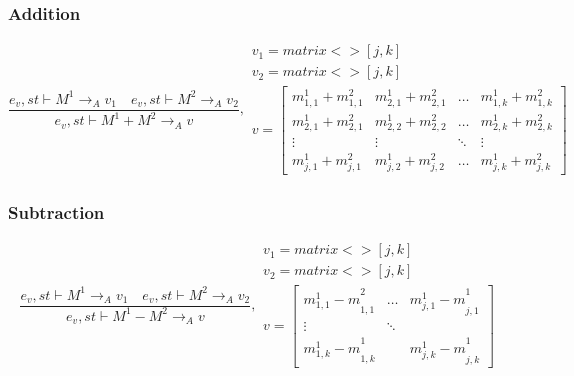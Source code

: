 \subsubsection{Addition}
\begin{equation}
	\frac { { e }_{ v },st\vdash { M }^{ 1 }{ \rightarrow  }_{ A }{ v }_{ 1 }\quad { e }_{ v },st\vdash { M }^{ 2 }{ \rightarrow  }_{ A }{ v }_{ 2 } }{ { e }_{ v },st\vdash { M }^{ 1 }+{ M }^{ 2 }{ \rightarrow  }_{ A }{ v } } ,\begin{matrix} { v }_{ 1 }=matrix<>[j,k] \\ { v }_{ 2 }=matrix<>[j,k] \\ v=\begin{bmatrix} { { m }_{ 1,1 }^{ 1 } } +{ { m }_{ 1,1 }^{ 2 } } & { { m }_{ 2,1 }^{ 1 } } + { { m }_{ 2,1 }^{ 2 } } & \dots  & { m }_{ 1,k }^{ 1 }+{ { m }_{ 1,k }^{ 2} } \\
{ { m }_{ 2,1 }^{ 1 } } + { { m }_{ 2,1 }^{ 2 } } &  { { m }_{ 2,2 }^{ 1 } } +{ { m }_{ 2,2 }^{ 2 } } & \dots & { { m }_{ 2,k }^{ 1 } } + { { m }_{ 2,k }^{ 2 } }
\\ \vdots  & \vdots & \ddots  & \vdots \\
 { m }_{ j,1 }^{ 1 } +{ { m }_{ j,1 }^{ 2 } } & { { m }_{ j,2 }^{ 1 } } +{ { m }_{ j,2 }^{ 2 } }  & \dots & { m }_{ j,k }^{ 1 }+{ { m }_{ j,k }^{ 2 } } \end{bmatrix}

 \end{matrix}
\end{equation}


\subsubsection{Subtraction}
\begin{equation}
	\frac { { e }_{ v },st\vdash { M }^{ 1 }{ \rightarrow  }_{ A }{ v }_{ 1 }\quad { e }_{ v },st\vdash { M }^{ 2 }{ \rightarrow  }_{ A }{ v }_{ 2 } }{ { e }_{ v },st\vdash { M }^{ 1 }-{ M }^{ 2 }{ \rightarrow  }_{ A }{ v } } ,\begin{matrix} { v }_{ 1 }=matrix<>[j,k] \\ { v }_{ 2 }=matrix<>[j,k] \\ v=\begin{bmatrix} { { m }_{ 1,1 }^{ 1 }-m }_{ 1,1 }^{ 2 } & \dots  & { { m }_{ j,1 }^{ 1 }-m }_{ j,1 }^{ 1 } \\ \vdots  & \ddots  &  \\ { { m }_{ 1,k }^{ 1 }-m }_{ 1,k }^{ 1 } &  & { { m }_{ j,k }^{ 1 }-m }_{ j,k }^{ 1 } \end{bmatrix} \end{matrix}
\end{equation}


